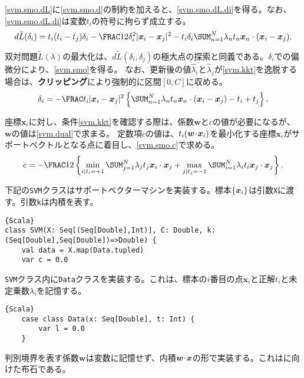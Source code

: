 \documentclass[10pt,a4paper]{book}
\begin{document}
\eqref{svm.smo.dL}に\eqref{svm.smo.d}の制約を加えると、\eqref{svm.smo.dL.di}を得る。なお、\eqref{svm.smo.dL.di}は変数$t_i$の符号に拘らず成立する。
%
\begin{equation}
\label{eq:svm.smo.dL.di}
d\tilde{L}(\delta_i) =
t_i (t_i - t_j) \delta_i -
\frac{1}{2} \delta_i^2 |\bm{x}_i - \bm{x}_j|^2 -
t_i \delta_i \sum_{n=1}^N \lambda_n t_n \dprod{\bm{x}_n}{(\bm{x}_i - \bm{x}_j)}.
\end{equation}

双対問題$\tilde{L}(\lambda)$の最大化は、$d\tilde{L}(\delta_i,\delta_j)$の極大点の探索と同義である。$\delta_i$での偏微分により、\eqref{svm.smo}を得る。
なお、更新後の値$\hat{\lambda}_i$と$\hat{\lambda}_j$が\eqref{svm.kkt}を逸脱する場合は、\textbf{クリッピング}により強制的に区間$[0,C]$に収める。
%
\begin{equation}
\label{eq:svm.smo}
\delta_i = - \frac{t_i}{|\bm{x}_i - \bm{x}_j|^2} \seq{\sum_{n=1}^N \lambda_n t_n \dprod{\bm{x}_n}{(\bm{x}_i - \bm{x}_j)} - t_i + t_j}.
\end{equation}

座標$\bm{x}_i$に対し、条件\eqref{svm.kkt}を確認する際は、係数$\bm{w}$と$c$の値が必要になるが、$\bm{w}$の値は\eqref{svm.dual}で求まる。
定数項$c$の値は、$t_i(\bm{w}\! \cdot \!\bm{x}_i)$を最小化する座標$\bm{x}_i$がサポートベクトルとなる点に着目し、\eqref{svm.smo.c}で求める。
%
\begin{equation}
\label{eq:svm.smo.c}
c = -\frac{1}{2} \seq{
\min_{i|t_i=+1} \sum_{j=1}^N \lambda_j t_j \dprod{\bm{x}_i}{\bm{x}_j} +
\max_{j|t_j=-1} \sum_{i=1}^N \lambda_i t_i \dprod{\bm{x}_j}{\bm{x}_j}}.
\end{equation}

下記の\texttt{SVM}クラスはサポートベクターマシンを実装する。標本$\seq{\bm{x}_i}$は引数\texttt{X}に渡す。引数\texttt{k}は内積を表す。

\begin{Verbatim}{Scala}
class SVM(X: Seq[(Seq[Double],Int)], C: Double, k: (Seq[Double],Seq[Double])=>Double) {
	val data = X.map(Data.tupled)
	var c = 0.0
\end{Verbatim}

\texttt{SVM}クラス内に\texttt{Data}クラスを実装する。これは、標本の$i$番目の点$\bm{x}_i$と正解$t_i$と未定乗数$\lambda_i$を記憶する。

\begin{Verbatim}{Scala}
	case class Data(x: Seq[Double], t: Int) {
		var l = 0.0
	}
\end{Verbatim}

判別境界を表す係数$\bm{w}$は変数に記憶せず、内積$\bm{w}\! \cdot \!\bm{x}$の形で実装する。これはに向けた布石である。
\end{document}
